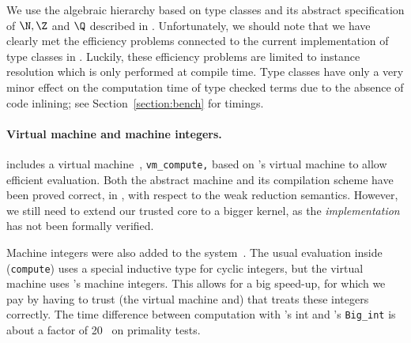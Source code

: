 \documentclass[a4paper,10pt,runningheads]{llncs}
\begin{document}
We use the algebraic hierarchy based on type classes and its abstract specification of $\N,\Z$ and $\Q$ described in \cite{math-classes}. Unfortunately, we should note that we have clearly met the efficiency problems connected to the current implementation of type classes in \Coq. Luckily, these efficiency problems are limited to instance resolution which is only performed at compile time. Type classes have only a very minor effect on the computation time of type checked terms due to the absence of code inlining; see Section~\ref{section:bench} for timings. 


\paragraph{Virtual machine and machine integers.}
\label{section:machine}
\Coq{} includes a virtual machine~\cite{Compiler}, \lstinline|vm_compute,| based on \OCaml{}'s virtual machine to allow efficient evaluation. 
Both the abstract machine and its compilation scheme have been proved correct, in \Coq, with respect to the weak reduction semantics. However, we still need to extend our trusted core to a bigger kernel, as the \emph{implementation} has not been formally verified.

Machine integers were also added to the \Coq{} system~\cite{machineintegers}. The usual evaluation inside \Coq{} (\lstinline|compute|) uses a special inductive type for cyclic integers, but the virtual machine uses \OCaml's machine integers. This allows for a big speed-up, for which we pay by having to trust (the virtual machine and) that \OCaml{} treats these integers correctly. The time difference between computation with \Coq's int and \OCaml's \lstinline|Big_int| is about a factor of 20~\cite{thesisSpiwack} on primality tests. 
\end{document}
